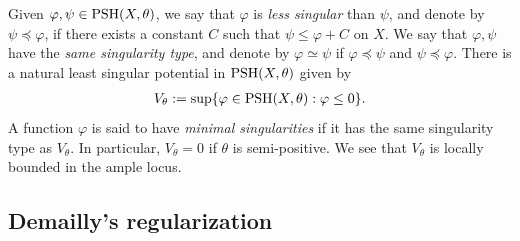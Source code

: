 \documentclass[a4paper,11pt]{amsart}
\numberwithin{equation}{section}
\theoremstyle{definition}
\newcommand{\PSH}{{\rm PSH}}
\begin{document}
Given $\varphi,\psi\in \PSH(X,\theta)$, we say that $\varphi$ is {\it less singular} than  $\psi$, and denote by $\psi\preceq\varphi$, if  there exists a constant $C$ such that $\psi\leq \varphi+C$ on $X$. We say that $\varphi,\psi$ have the {\em same singularity type}, and denote by $\varphi\simeq\psi$ if $\varphi\preceq\psi$ and $\psi\preceq \varphi$. 
There is a
natural least singular potential in $\PSH(X,\theta)$ given by
\begin{align*}
	V_{\theta}:=\sup\{\varphi\in \PSH(X,\theta): \varphi\leq 0\}.
	\end{align*}
A function $\varphi$ is said to have {\em minimal singularities} if it has the same singularity type as $V_\theta$. In particular, $V_\theta=0$ if $\theta$ is semi-positive.
We see that $V_\theta$ is locally bounded in the ample locus.

\subsection{Demailly's regularization} 
\end{document}
